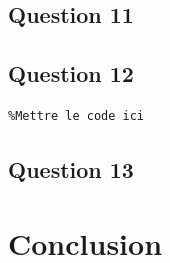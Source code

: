 \documentclass[a4paper,11pt]{article}
\begin{document}
\subsection{Question 11}

\subsection{Question 12}
\begin{verbatim}
%Mettre le code ici
\end{verbatim}

\subsection{Question 13}

\section{Conclusion}
\end{document}
